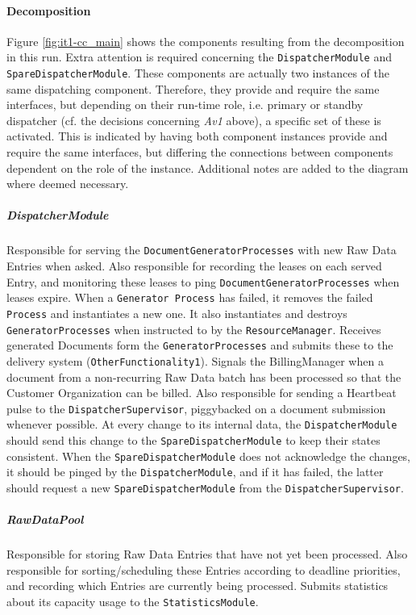 \documentclass[a4paper,10pt]{article}
\begin{document}
\paragraph{Decomposition}
Figure \ref{fig:it1-cc_main} shows the components resulting from the decomposition in this run. Extra attention is required concerning the \texttt{DispatcherModule} and \texttt{SpareDispatcherModule}. These components are actually two instances of the same dispatching component. Therefore, they provide and require the same interfaces, but depending on their run-time role, i.e. primary or standby dispatcher (cf. the decisions concerning \emph{Av1} above), a specific set of these is activated. This is indicated by having both component instances provide and require the same interfaces, but differing the connections between components dependent on the role of the instance. Additional notes are added to the diagram where deemed necessary.

\subparagraph{DispatcherModule}
Responsible for serving the \texttt{DocumentGeneratorProcesses} with new Raw Data Entries when asked. Also responsible for recording the leases on each served Entry, and monitoring these leases to ping \texttt{DocumentGeneratorProcesses} when leases expire. When a \texttt{Generator Process} has failed, it removes the failed \texttt{Process} and instantiates a new one. It also instantiates and destroys \texttt{GeneratorProcesses} when instructed to by the \texttt{ResourceManager}. Receives generated Documents form the \texttt{GeneratorProcesses} and submits these to the delivery system (\texttt{OtherFunctionality1}). Signals the BillingManager when a document from a non-recurring Raw Data batch has been processed so that the Customer Organization can be billed. Also responsible for sending a Heartbeat pulse to the \texttt{DispatcherSupervisor}, piggybacked on a document submission whenever possible. At every change to its internal data, the \texttt{DispatcherModule} should send this change to the \texttt{SpareDispatcherModule} to keep their states consistent. When the \texttt{SpareDispatcherModule} does not acknowledge the changes, it should be pinged by the \texttt{DispatcherModule}, and if it has failed, the latter should request a new \texttt{SpareDispatcherModule} from the \texttt{DispatcherSupervisor}.

\subparagraph{RawDataPool}
Responsible for storing Raw Data Entries that have not yet been processed. Also responsible for sorting/scheduling these Entries according to deadline priorities, and recording which Entries are currently being processed. Submits statistics about its capacity usage to the \texttt{StatisticsModule}.
\end{document}
